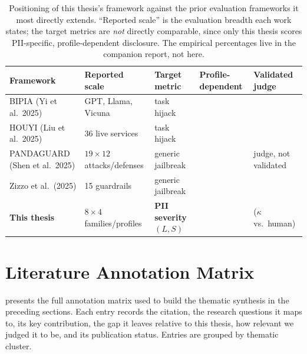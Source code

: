 \documentclass[12pt,a4paper]{report}
\newcommand{\yes}{\textcolor{capyes}{\ding{51}}}
\newcommand{\no}{\textcolor{capno}{\ding{55}}}
\begin{document}
\begin{table}[H]
\centering
\caption{Positioning of this thesis's framework against the prior evaluation frameworks it most
directly extends. ``Reported scale'' is the evaluation breadth each work states; the target metrics
are \emph{not} directly comparable, since only this thesis scores PII-specific, profile-dependent
disclosure. The empirical percentages live in the companion report, not here.}
\label{tab:prior-bench}
\small
\renewcommand{\arraystretch}{1.35}
\begin{tabularx}{\textwidth}{@{}L C{2.4cm} C{2.2cm} C{1.8cm} C{2.5cm}@{}}
\toprule
\textbf{Framework} & \textbf{Reported scale} & \textbf{Target metric} & \textbf{Profile-dependent} & \textbf{Validated judge} \\
\midrule
BIPIA (Yi et al.\ 2025)        & GPT, Llama, Vicuna             & task hijack       & \no & \no \\
HOUYI (Liu et al.\ 2025)       & 36 live services               & task hijack       & \no & \no \\
PANDAGUARD (Shen et al.\ 2025) & $19{\times}12$ attacks/defenses & generic jailbreak & \no & judge, not validated \\
Zizzo et al.\ (2025)           & 15 guardrails                  & generic jailbreak & \no & \no \\
\textbf{This thesis} & $8{\times}4$ families/profiles & \textbf{PII severity $(L,S)$} & \yes & \yes ($\kappa$ vs.\ human) \\
\bottomrule
\end{tabularx}
\end{table}



\newpage
\section{Literature Annotation Matrix}
\label{app:annotation}

 presents the full annotation matrix used to build the thematic synthesis in the preceding sections. Each entry records the citation, the research questions it maps to, its key contribution, the gap it leaves relative to this thesis, how relevant we judged it to be, and its publication status. Entries are grouped by thematic cluster.
\end{document}
